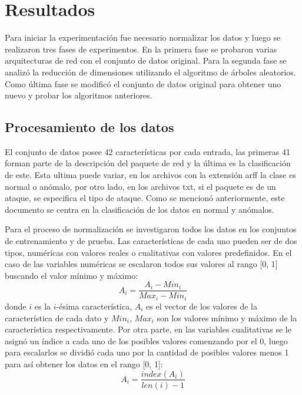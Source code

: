 \chapter{Resultados}\label{chapter:results}

Para iniciar la experimentación fue necesario normalizar los datos y luego se realizaron tres fases de experimentos. En la primera fase se probaron varias arquitecturas de red con el conjunto de datos original. Para la segunda fase se analizó la reducción de dimensiones utilizando el algoritmo de \'arboles aleatorios. Como última fase se modificó el conjunto de datos original para obtener uno nuevo y probar los algoritmos anteriores.

\section{Procesamiento de los datos}
El conjunto de datos posee 42 características por cada entrada, las primeras 41 forman parte de la descripción del paquete de red y la última es la clasificación de este. Esta ultima puede variar, en los archivos con la extensión arff la clase es normal o anómalo, por otro lado, en los archivos txt, si el paquete es de un ataque, se especifica el tipo de ataque. Como se mencionó anteriormente, este documento se centra en la clasificación de los datos en normal y anómalos.

Para el proceso de normalización se investigaron todos los datos en los conjuntos de entrenamiento y de prueba. Las características de cada uno pueden ser de dos tipos, numéricas con valores reales o cualitativas con valores predefinidos. En el caso de las variables numéricas se escalaron todos sus valores al rango [0, 1] buscando el valor mínimo y máximo:
\[A_{i} = \frac{A_{i} - Min_{i}}{Max_{i} - Min_{i}}\] 
donde $i$ es la $i$-\'esima característica, $A_{i}$ es el vector de los valores de la característica de cada dato y $Min_{i}$, $Max_{i}$ son los valores mínimo y máximo de la característica respectivamente. Por otra parte, en las variables cualitativas se le asignó un índice a cada uno de los posibles valores comenzando por el 0, luego para escalarlos se dividió cada uno por la cantidad de posibles valores menos 1 para así obtener los datos en el rango [0, 1]:
\[A_{i} = \frac{index(A_{i})}{len(i) - 1}\]

